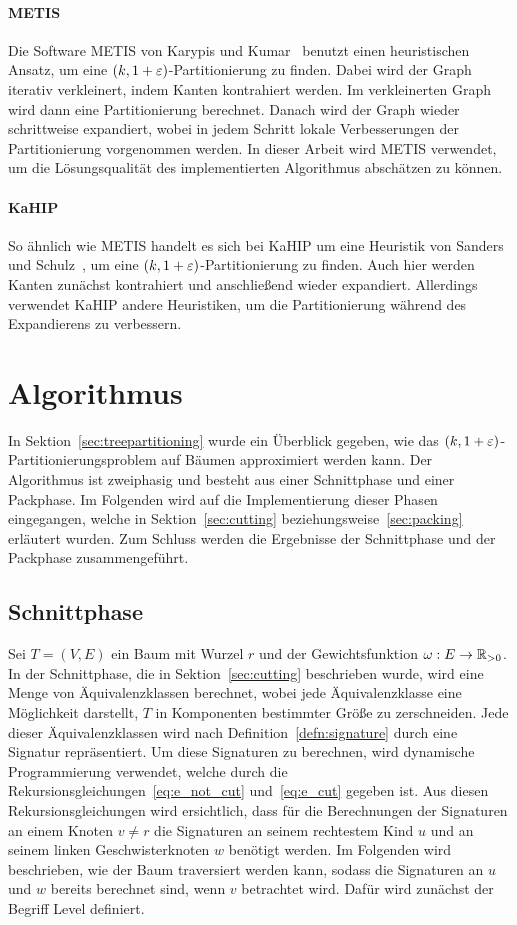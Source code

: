 \paragraph{METIS}
Die Software METIS von Karypis und Kumar~\cite{KK98} benutzt einen heuristischen Ansatz, um eine $(k, 1 + \varepsilon)$\hyp Partitionierung zu finden. 
Dabei wird der Graph iterativ verkleinert, indem Kanten kontrahiert werden.
Im verkleinerten Graph wird dann eine Partitionierung berechnet.
Danach wird der Graph wieder schrittweise expandiert, wobei in jedem Schritt lokale Verbesserungen der Partitionierung vorgenommen werden.
In dieser Arbeit wird METIS verwendet, um die Lösungsqualität des implementierten Algorithmus abschätzen zu können.

\paragraph{KaHIP}
So ähnlich wie METIS handelt es sich bei KaHIP um eine Heuristik von Sanders und Schulz~\cite{SS13}, um eine $(k, 1 + \varepsilon)$\hyp Partitionierung zu finden.
Auch hier werden Kanten zunächst kontrahiert und anschließend wieder expandiert.
Allerdings verwendet KaHIP andere Heuristiken, um die Partitionierung während des Expandierens zu verbessern.

\section{Algorithmus}\label{sec:algimpl}
In Sektion~\ref{sec:treepartitioning} wurde ein Überblick gegeben, wie das $(k,1+\varepsilon)$\hyp Partitionierungsproblem auf Bäumen approximiert werden kann. 
Der Algorithmus ist zweiphasig und besteht aus einer Schnittphase und einer Packphase.
Im Folgenden wird auf die Implementierung dieser Phasen eingegangen, welche in Sektion~\ref{sec:cutting} beziehungsweise~\ref{sec:packing} erläutert wurden.
Zum Schluss werden die Ergebnisse der Schnittphase und der Packphase zusammengeführt.

\subsection{Schnittphase}\label{sec:cuttingimpl}
Sei $T=(V,E)$ ein Baum mit Wurzel $r$ und der Gewichtsfunktion $\omega : E \rightarrow \mathbb{R}_{> 0}$.
In der Schnittphase, die in Sektion~\ref{sec:cutting} beschrieben wurde, wird eine Menge von Äquivalenzklassen berechnet, wobei jede Äquivalenzklasse eine Möglichkeit darstellt, $T$ in Komponenten bestimmter Größe zu zerschneiden.
Jede dieser Äquivalenzklassen wird nach Definition~\ref{defn:signature} durch eine Signatur repräsentiert.
Um diese Signaturen zu berechnen, wird dynamische Programmierung verwendet, welche durch die Rekursionsgleichungen~\eqref{eq:e_not_cut} und~\eqref{eq:e_cut} gegeben ist.
Aus diesen Rekursionsgleichungen wird ersichtlich, dass für die Berechnungen der Signaturen an einem Knoten $v \neq r$ die Signaturen an seinem rechtestem Kind $u$ und an seinem linken Geschwisterknoten $w$ benötigt werden.
Im Folgenden wird beschrieben, wie der Baum traversiert werden kann, sodass die Signaturen an $u$ und $w$ bereits berechnet sind, wenn $v$ betrachtet wird. 
Dafür wird zunächst der Begriff Level definiert.

